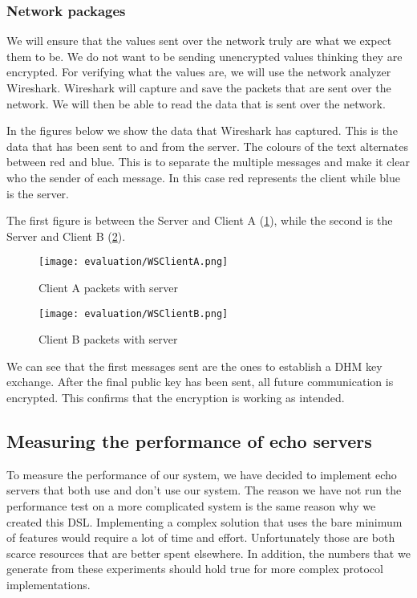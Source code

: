 \subsubsection{Network packages}
We will ensure that the values sent over the network truly are what we expect them to be. We do not want to be sending unencrypted values thinking they are encrypted.  For verifying what the values are, we will use the network analyzer Wireshark. Wireshark will capture and save the packets that are sent over the network. We will then be able to read the data that is sent over the network.

In the figures below we show the data that Wireshark has captured. This is the data that has been sent to and from the server. The colours of the text alternates between red and blue. This is to separate the multiple messages and make it clear who the sender of each message. In this case red represents the client while blue is the server.

The first figure is between the Server and Client A (\ref{fig:wsclienta}), while the second is the Server and Client B (\ref{fig:wsclientb}).

\begin{figure}[H]
  \centering
  \texttt{[image: evaluation/WSClientA.png]}
  \caption{Client A packets with server}
  \label{fig:wsclienta}
\end{figure}

\begin{figure}[H]
  \centering
  \texttt{[image: evaluation/WSClientB.png]}
  \caption{Client B packets with server}
  \label{fig:wsclientb}
\end{figure}
We can see that the first messages sent are the ones to establish a DHM key exchange. After the final public key has been sent, all future communication is encrypted. This confirms that the encryption is working as intended.

\subsection{Measuring the performance of echo servers}
To measure the performance of our system, we have decided to implement echo servers that both use and don't use our system. The reason we have not run the performance test on a more complicated system is the same reason why we created this DSL. Implementing a complex solution that uses the bare minimum of features would require a lot of time and effort. Unfortunately those are both scarce resources that are better spent elsewhere. In addition, the numbers that we generate from these experiments should hold true for more complex protocol implementations. 

